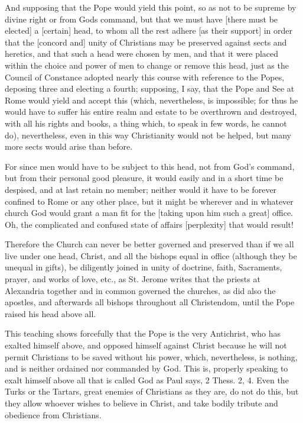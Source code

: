 And supposing that the Pope would yield this point, so as not
to be supreme by divine right or from Gods command, but that
we must have [there must be elected] a [certain] head, to whom
all the rest adhere [as their support] in order that the
[concord and] unity of Christians may be preserved against
sects and heretics, and that such a head were chosen by men,
and that it were placed within the choice and power of men to
change or remove this head, just as the Council of Constance
adopted nearly this course with reference to the Popes,
deposing three and electing a fourth; supposing, I say, that
the Pope and See at Rome would yield and accept this (which,
nevertheless, is impossible; for thus he would have to suffer
his entire realm and estate to be overthrown and destroyed,
with all his rights and books, a thing which, to speak in few
words, he cannot do), nevertheless, even in this way
Christianity would not be helped, but many more sects would
arise than before.

For since men would have to be subject to this head, not from
God's command, but from their personal good pleasure, it would
easily and in a short time be despised, and at last retain no
member; neither would it have to be forever confined to Rome
or any other place, but it might be wherever and in whatever
church God would grant a man fit for the [taking upon him such
a great] office. Oh, the complicated and confused state of
affairs [perplexity] that would result!

Therefore the Church can never be better governed and
preserved than if we all live under one head, Christ, and all
the bishops equal in office (although they be unequal in
gifts), be diligently joined in unity of doctrine, faith,
Sacraments, prayer, and works of love, etc., as St. Jerome
writes that the priests at Alexandria together and in common
governed the churches, as did also the apostles, and
afterwards all bishops throughout all Christendom, until the
Pope raised his head above all.

This teaching shows forcefully that the Pope is the very
Antichrist, who has exalted himself above, and opposed himself
against Christ because he will not permit Christians to be
saved without his power, which, nevertheless, is nothing, and
is neither ordained nor commanded by God. This is, properly
speaking to exalt himself above all that is called God as Paul
says, 2 Thess. 2, 4. Even the Turks or the Tartars, great
enemies of Christians as they are, do not do this, but they
allow whoever wishes to believe in Christ, and take bodily
tribute and obedience from Christians.

